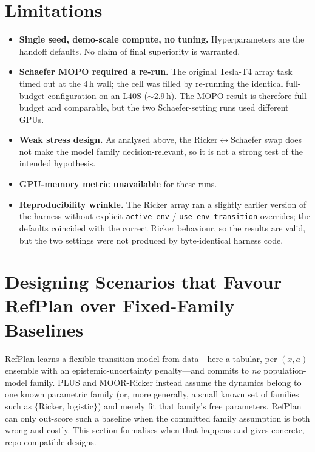 \documentclass[11pt]{article}
\begin{document}
\section{Limitations}
\begin{itemize}
  \item \textbf{Single seed, demo-scale compute, no tuning.} Hyperparameters are
  the handoff defaults. No claim of final superiority is warranted.
  \item \textbf{Schaefer MOPO required a re-run.} The original Tesla-T4 array task
  timed out at the 4\,h wall; the cell was filled by re-running the identical
  full-budget configuration on an L40S ($\sim$2.9\,h). The MOPO result is therefore
  full-budget and comparable, but the two Schaefer-setting runs used different GPUs.
  \item \textbf{Weak stress design.} As analysed above, the Ricker$\leftrightarrow$Schaefer
  swap does not make the model family decision-relevant, so it is not a strong
  test of the intended hypothesis.
  \item \textbf{GPU-memory metric unavailable} for these runs.
  \item \textbf{Reproducibility wrinkle.} The Ricker array ran a slightly earlier
  version of the harness without explicit \texttt{active\_env} /
  \texttt{use\_env\_transition} overrides; the defaults coincided with the correct
  Ricker behaviour, so the results are valid, but the two settings were not
  produced by byte-identical harness code.
\end{itemize}

\section{Designing Scenarios that Favour RefPlan over Fixed-Family Baselines}
\label{sec:design}

RefPlan learns a flexible transition model from data---here a tabular, per-$(x,a)$
ensemble with an epistemic-uncertainty penalty---and commits to \emph{no}
population-model family. PLUS and MOOR-Ricker instead assume the dynamics belong to
one known parametric family (or, more generally, a small known set of families such
as $\{$Ricker, logistic$\}$) and merely fit that family's free parameters. RefPlan
can only out-score such a baseline when the committed family assumption is both
wrong and costly. This section formalises when that happens and gives concrete,
repo-compatible designs.
\end{document}
